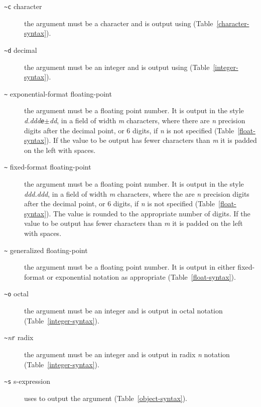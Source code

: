 \begin{optDefinition}
\begin{description}
    \item[{\tt\textasciitilde c} character]%
    the argument must be a character and is output using 
    (Table~\ref{character-syntax}).

    \item[{\tt\textasciitilde d} decimal]%
    the argument must be an integer and is output using 
    (Table~\ref{integer-syntax}).

    \item[{\tt\textasciitilde}
    exponential-format floating-point]%
    the argument must be a floating point number.  It is output in the style
    \mbox{\em\optional{-}d.ddd{\tt{e}}$\pm$dd}, in a field of width {\em m\/}
    characters, where there are {\em n\/} precision digits after the decimal
    point, or 6 digits, if {\em n\/} is not specified
    (Table~\ref{float-syntax}).  If the value to be output has fewer characters
    than {\em m\/} it is padded on the left with spaces.

    \item[{\tt\textasciitilde}
    fixed-format floating-point]%
    the argument must be a floating point number.  It is output in the style
    \mbox{\em\optional{-}ddd.ddd}, in a field of width {\em m\/} characters,
    where the are {\em n\/} precision digits after the decimal point, or 6
    digits, if {\em n\/} is not specified (Table~\ref{float-syntax}).  The value
    is rounded to the appropriate number of digits.  If the value to be output
    has fewer characters than {\em m\/} it is padded on the left with spaces.

    \item[{\tt\textasciitilde}
    generalized floating-point]%
    the argument must be a floating point number.  It is output in either
    fixed-format or exponential notation as appropriate
    (Table~\ref{float-syntax}).

    \item[{\tt\textasciitilde o} octal]%
    the argument must be an integer and is output in octal notation
    (Table~\ref{integer-syntax}).

    \item[{\tt\textasciitilde}{\em n}{\tt r} radix]%
    the argument must be an integer and is output in radix {\em n\/} notation
    (Table~\ref{integer-syntax}).

    \item[{\tt\textasciitilde s} s-expression]%
    uses  to output the argument (Table~\ref{object-syntax}).


\end{description}
\end{optDefinition}
